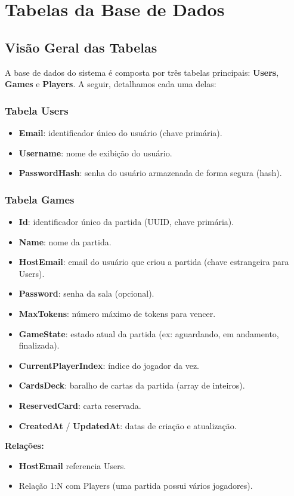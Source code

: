 \chapter{Tabelas da Base de Dados}

\section{Visão Geral das Tabelas}
A base de dados do sistema é composta por três tabelas principais: \textbf{Users}, \textbf{Games} e \textbf{Players}. A seguir, detalhamos cada uma delas:

\subsection{Tabela Users}
\begin{itemize}
    \item \textbf{Email}: identificador único do usuário (chave primária).
    \item \textbf{Username}: nome de exibição do usuário.
    \item \textbf{PasswordHash}: senha do usuário armazenada de forma segura (hash).
\end{itemize}

\subsection{Tabela Games}
\begin{itemize}
    \item \textbf{Id}: identificador único da partida (UUID, chave primária).
    \item \textbf{Name}: nome da partida.
    \item \textbf{HostEmail}: email do usuário que criou a partida (chave estrangeira para Users).
    \item \textbf{Password}: senha da sala (opcional).
    \item \textbf{MaxTokens}: número máximo de tokens para vencer.
    \item \textbf{GameState}: estado atual da partida (ex: aguardando, em andamento, finalizada).
    \item \textbf{CurrentPlayerIndex}: índice do jogador da vez.
    \item \textbf{CardsDeck}: baralho de cartas da partida (array de inteiros).
    \item \textbf{ReservedCard}: carta reservada.
    \item \textbf{CreatedAt} / \textbf{UpdatedAt}: datas de criação e atualização.
\end{itemize}
\textbf{Relações:}
\begin{itemize}
    \item \textbf{HostEmail} referencia Users.
    \item Relação 1:N com Players (uma partida possui vários jogadores).
\end{itemize}


